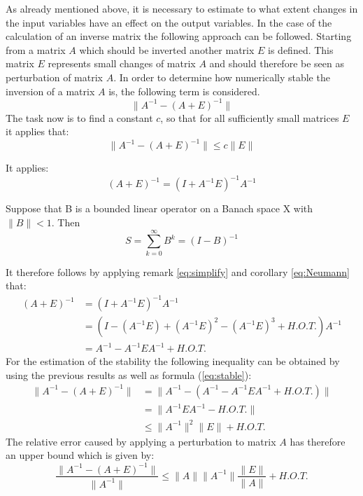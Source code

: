 As already mentioned above, it is necessary to estimate to what extent changes in the input variables have an effect on the output variables. In the case of the calculation of an inverse matrix the following approach can be followed. Starting from a matrix $A$ which should be inverted another matrix $E$ is defined. This matrix $E$ represents small changes of matrix $A$ and should therefore be seen as perturbation of matrix $A$. In order to determine how numerically stable the inversion of a matrix $A$ is, the following term is considered.
\begin{equation}\label{eq:stable}
	\lVert A^{-1} - (A + E)^{-1} \rVert
\end{equation}
The task now is to find a constant $c$, so that for all sufficiently small matrices $E$ it applies that:
\begin{equation}
	\lVert A^{-1} - (A + E)^{-1} \rVert \leq c \lVert E \rVert
\end{equation}
 
\begin{remark}\label{eq:simplify}
	It applies:
	\begin{equation*}
		(A + E)^{-1} = (I + A^{-1}E)^{-1}A^{-1}
	\end{equation*}
\end{remark}

\begin{corollary}\label{eq:Neumann}
	Suppose that B is a bounded linear operator on a Banach space X with $\lVert B \rVert < 1$. Then	
	\begin{equation}
		S = \sum_{k=0}^\infty B^k = (I-B)^{-1}
	\end{equation}  
\end{corollary}
It therefore follows by applying remark \ref{eq:simplify} and corollary \ref{eq:Neumann} that:
\begin{align*}
	(A + E)^{-1} 	&= (I + A^{-1}E)^{-1}A^{-1} \\
					&= (I - (A^{-1}E) + (A^{-1}E)^2 - (A^{-1}E)^3 + H.O.T.) A^{-1} \\
					&= A^{-1} - A^{-1} E A^{-1} + H.O.T.
\end{align*}
 For the estimation of the stability the following inequality can be obtained by using the previous results as well as formula (\ref{eq:stable}):
\begin{align*}
	\lVert A^{-1} - (A + E)^{-1} \rVert & = \lVert A^{-1} - (A^{-1} - A^{-1}EA^{-1} + H.O.T.) \rVert \\
		& = \lVert A^{-1}EA^{-1} - H.O.T. \rVert \\
		& \leq \lVert A^{-1} \rVert^2 \lVert E \rVert +  H.O.T.
\end{align*}
The relative error caused by applying a perturbation to matrix $A$ has therefore an upper bound which is given by: 
\begin{equation}\label{eq:upper_bound}
 \frac{\lVert A^{-1} - (A + E)^{-1} \rVert}{\lVert A^{-1}\rVert} \leq \lVert A \rVert \lVert A^{-1} \rVert \frac{\lVert E \rVert}{\lVert A \rVert} + H.O.T.
\end{equation}

